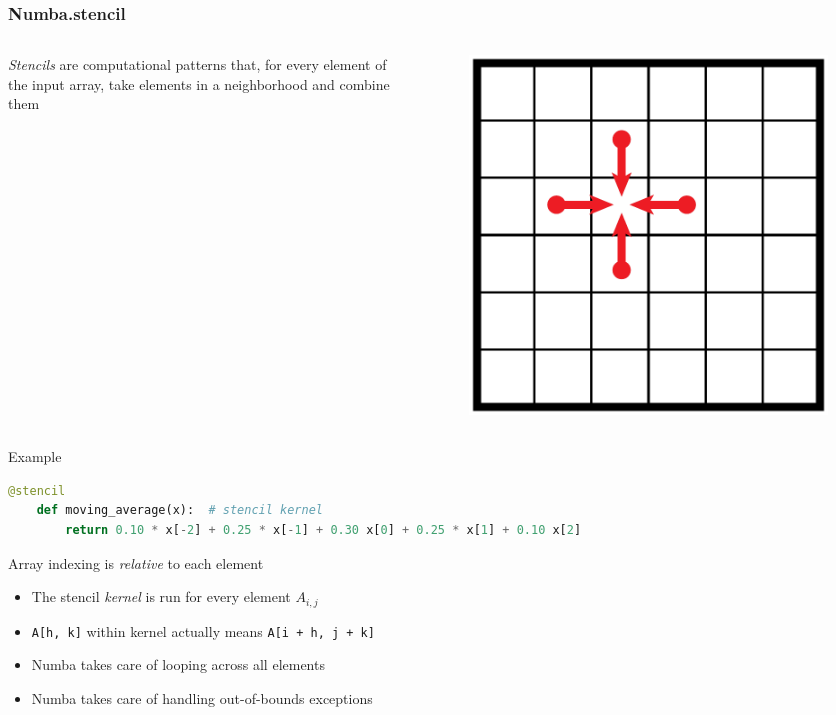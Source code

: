\documentclass[10pt, aspectratio=1610]{beamer}
\begin{document}
\begin{frame}[fragile]
  \frametitle{Numba.stencil}

  \begin{columns}
    \begin{column}{0.75\textwidth}
      \emph{Stencils} are computational patterns that, for every element of the input array, take elements in a neighborhood and combine them
    \end{column}
    \begin{column}{0.15\textwidth}
      \begin{figure}
        \centering
        \includegraphics[width=\textwidth]{./img/stencil.pdf}
      \end{figure}
    \end{column}
  \end{columns}

  \vfill

  Example
  \begin{lstlisting}[language=python]
    @stencil
    def moving_average(x):  # stencil kernel
        return 0.10 * x[-2] + 0.25 * x[-1] + 0.30 x[0] + 0.25 * x[1] + 0.10 x[2]
  \end{lstlisting}

  \vfill

  Array indexing is \emph{relative} to each element
  \begin{itemize}
    \item The stencil \emph{kernel} is run for every element $A_{i,j}$
    \item \lstinline{A[h, k]} within kernel actually means \lstinline{A[i + h, j + k]}
    \item Numba takes care of looping across all elements
    \item Numba takes care of handling out-of-bounds exceptions
  \end{itemize}

\end{frame}
\end{document}
